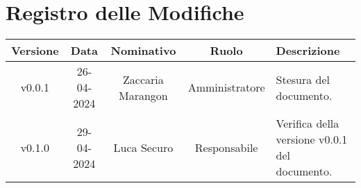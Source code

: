 \section*{\Large Registro delle Modifiche}
    \begin{table}[h]
        \centering
        \renewcommand\tabularxcolumn[1]{m{#1}} %
        \renewcommand{\arraystretch}{1.5}
        \begin{tabularx}{0.98\textwidth}
            {c|c|c|c|>{\centering\arraybackslash}X}
            \rowcolor{black}
            \textbf{\color{white} Versione} & \textbf{\color{white} Data} & \textbf{\color{white} Nominativo} & \textbf{\color{white} Ruolo} & \textbf{\color{white} Descrizione} \\ 
            \hline

            v0.0.1 & 26-04-2024 & Zaccaria Marangon & Amministratore & Stesura del documento.\\
            v0.1.0 & 29-04-2024 & Luca Securo & Responsabile & Verifica della versione v0.0.1 del documento.\\
           
            \hline
        \end{tabularx}
    \end{table}